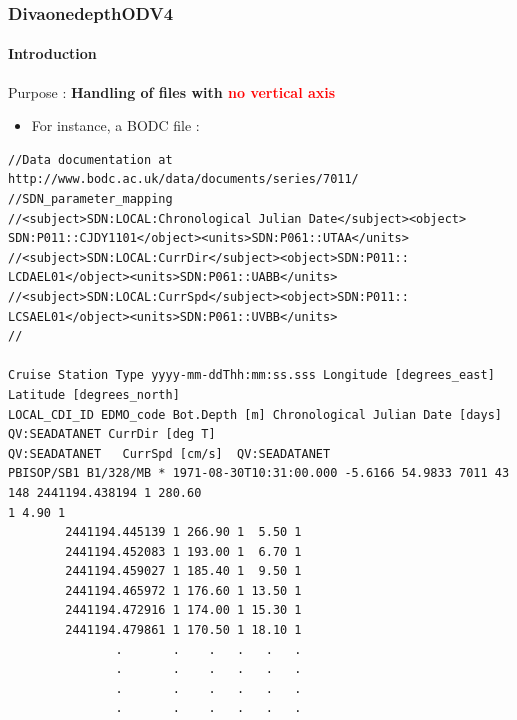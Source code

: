 \begin{frame}[fragile]
\frametitle{DivaonedepthODV4}
\framesubtitle{Introduction}

Purpose : \textbf{Handling of files with \textcolor{red}{no vertical axis}}

\pause

\begin{itemize}
 \item For instance, a BODC file :
\end{itemize}

\begin{changemargin}{-0.9cm}{0cm}
\begin{tiny}
\begin{verbatim}
//Data documentation at http://www.bodc.ac.uk/data/documents/series/7011/
//SDN_parameter_mapping
//<subject>SDN:LOCAL:Chronological Julian Date</subject><object>
SDN:P011::CJDY1101</object><units>SDN:P061::UTAA</units>
//<subject>SDN:LOCAL:CurrDir</subject><object>SDN:P011::
LCDAEL01</object><units>SDN:P061::UABB</units>
//<subject>SDN:LOCAL:CurrSpd</subject><object>SDN:P011::
LCSAEL01</object><units>SDN:P061::UVBB</units>
//

Cruise Station Type yyyy-mm-ddThh:mm:ss.sss Longitude [degrees_east] Latitude [degrees_north] 
LOCAL_CDI_ID EDMO_code Bot.Depth [m] Chronological Julian Date [days] QV:SEADATANET CurrDir [deg T] 
QV:SEADATANET   CurrSpd [cm/s]  QV:SEADATANET
PBISOP/SB1 B1/328/MB * 1971-08-30T10:31:00.000 -5.6166 54.9833 7011 43 148 2441194.438194 1 280.60 
1 4.90 1
        2441194.445139 1 266.90 1  5.50 1
        2441194.452083 1 193.00 1  6.70 1
        2441194.459027 1 185.40 1  9.50 1
        2441194.465972 1 176.60 1 13.50 1
        2441194.472916 1 174.00 1 15.30 1
        2441194.479861 1 170.50 1 18.10 1
               .       .    .   .   .   .
               .       .    .   .   .   .
               .       .    .   .   .   .
               .       .    .   .   .   .

\end{verbatim} 
\end{tiny}
\end{changemargin}

\end{frame}
